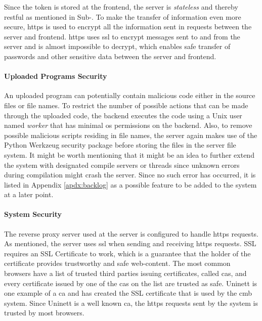 Since the token is stored at the frontend, the server is \textit{stateless} and thereby \gls{rest}ful as mentioned in Sub-. To make the transfer of information even more secure, \gls{https} is used to encrypt all the information sent in requests between the server and frontend. \gls{https} uses \gls{ssl} to encrypt messages sent to and from the server and is almost impossible to decrypt, which enables safe transfer of passwords and other sensitive data between the server and frontend.

\paragraph*{Uploaded Programs Security} An uploaded program can potentially contain malicious code either in the source files or file names. To restrict the number of possible actions that can be made through the uploaded code, the backend executes the code using a Unix user named \textit{worker} that has minimal \gls{os} permissions on the backend. Also, to remove possible malicious scripts residing in file names, the server again makes use of the Python Werkzeug security package \cite{WERKZEUG} before storing the files in the server file system. It might be worth mentioning that it might be an idea to further extend the system with designated compile servers or threads since unknown errors during compilation might crash the server. Since no such error has occurred, it is listed in Appendix \ref{apdx:backlog} as a possible feature to be added to the system at a later point.

\paragraph*{System Security} The reverse proxy server used at the server is configured to handle \gls{https} requests. As mentioned, the server uses \gls{ssl} when sending and receiving \gls{https} requests. SSL requires an SSL Certificate to work, which is a guarantee that the holder of the certificate provides trustworthy and safe web-content. The most common browsers have a list of trusted third parties issuing certificates, called \glspl{ca}, and every certificate issued by one of the \glspl{ca} on the list are trusted as safe. Uninett \cite{UNINETT} is one example of a \gls{ca} and has created the SSL certificate that is used by the \gls{cmb} system. Since Uninett is a well known \gls{ca}, the \gls{https} requests sent by the system is trusted by most browsers. \\

